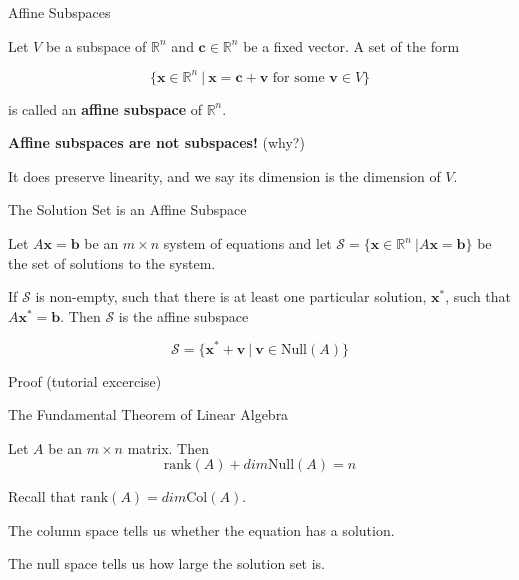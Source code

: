 \documentclass[11pt, xcolor={dvipsnames}, hyperref={colorlinks, allcolors=Blue}]{beamer}
\newcommand\bc[1]{{\usebeamercolor[fg]{frametitle} {\textbf{#1}}}} %
\newcommand{\R}{\mathbb{R}}
\renewcommand{\b}{\mathbf{b}}
\newcommand{\x}{\mathbf{x}}
\renewcommand{\v}{\mathbf{v}}
\begin{document}
\begin{frame}{Affine Subspaces}

Let $V$ be a subspace of $\R^{n}$ and $\mathbf{c} \in \R^{n}$ be a fixed vector. A set of the form

\[ \{\x \in \R^{n} \ | \ \x = \mathbf{c} + \v \text{ for some } \v \in V\}\]

is called an \bc{affine subspace} of $\R^{n}$.\bigskip

\textbf{Affine subspaces are not subspaces!} (why?)\bigskip

It does preserve linearity, and we say its dimension is the dimension of $V$.
\end{frame}
\begin{frame}{The Solution Set is an Affine Subspace}

Let $A\x = \b$ be an $m \times n$ system of equations and let $\mathcal{S} = \{\x \in \R^{n} \ | A\x = \b\}$ be the set of solutions to the system.\bigskip

\begin{theorem}
If $\mathcal{S}$ is non-empty, such that there is at least one particular solution, $\x^{*}$, such that $A\x^{*} = \b$. Then $\mathcal{S}$ is the affine subspace

\[\mathcal{S} = \{\x^{*} + \v \ | \ \v \in \text{Null}(A)\}\]
\end{theorem}

Proof (tutorial excercise) 
\end{frame}


\begin{frame}{The Fundamental Theorem of Linear Algebra}

\begin{theorem}
Let $A$ be an $m \times n$ matrix. Then
\[ \text{rank}(A) + dim \text{Null}(A) = n\]
\end{theorem}
\bigskip

Recall that $\text{rank}(A) = dim \text{Col}(A)$.\bigskip

The column space tells us whether the equation has a solution.\bigskip

The null space tells us how large the solution set is. 
\end{frame}
\end{document}
